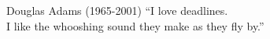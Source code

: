 \vspace*{\fill}
{\raggedleft
\thispagestyle{empty} %
\begin{chapquote}{Douglas Adams (1965-2001)}
  ``I love deadlines. \\    
  I like the whooshing sound they make as they fly by.''
\end{chapquote}}
\vspace*{\fill}